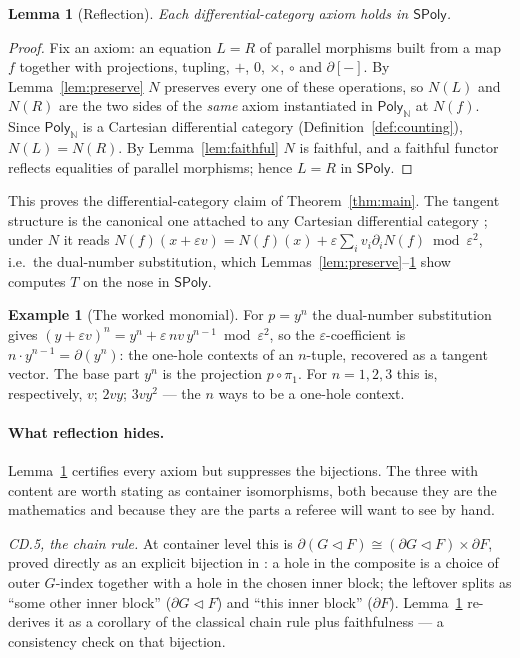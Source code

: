 \documentclass[11pt]{article}
\newtheorem{lemma}[theorem]{Lemma}
\theoremstyle{definition}
\newtheorem{example}[theorem]{Example}
\newcommand{\SPoly}{\mathsf{SPoly}}
\newcommand{\PolyN}{\mathsf{Poly}_{\mathbb{N}}}
\begin{document}
\begin{lemma}[Reflection]\label{lem:reflect}
Each differential-category axiom holds in $\SPoly$.
\end{lemma}

\begin{proof}
Fix an axiom: an equation $L=R$ of parallel morphisms built from a map $f$ together with
projections, tupling, $+$, $0$, $\times$, $\circ$ and $\partial[-]$. By Lemma~\ref{lem:preserve} $N$
preserves every one of these operations, so $N(L)$ and $N(R)$ are the two sides of the \emph{same}
axiom instantiated in $\PolyN$ at $N(f)$. Since $\PolyN$ is a Cartesian differential category
(Definition~\ref{def:counting}), $N(L)=N(R)$. By Lemma~\ref{lem:faithful} $N$ is faithful, and a
faithful functor reflects equalities of parallel morphisms; hence $L=R$ in $\SPoly$.
\end{proof}

This proves the differential-category claim of Theorem~\ref{thm:main}. The tangent structure is the
canonical one attached to any Cartesian differential category \cite[Prop.~4.7]{CockettCruttwell2014};
under $N$ it reads $N(f)(x+\varepsilon v)=N(f)(x)+\varepsilon\sum_i v_i\partial_i N(f)\bmod\varepsilon^2$,
i.e.\ the dual-number substitution, which Lemmas~\ref{lem:preserve}--\ref{lem:reflect} show computes
$T$ on the nose in $\SPoly$.

\begin{example}[The worked monomial]\label{ex:yn}
For $p=y^n$ the dual-number substitution gives
$(y+\varepsilon v)^n=y^n+\varepsilon\,n v\,y^{n-1}\bmod\varepsilon^2$, so the $\varepsilon$-coefficient
is $n\cdot y^{n-1}=\partial(y^n)$: the one-hole contexts of an $n$-tuple, recovered as a tangent vector.
The base part $y^n$ is the projection $p\circ\pi_1$. For $n=1,2,3$ this is, respectively, $v$;
$2vy$; $3vy^2$ --- the $n$ ways to be a one-hole context.
\end{example}

\paragraph{What reflection hides.}
Lemma~\ref{lem:reflect} certifies every axiom but suppresses the bijections. The three with content
are worth stating as container isomorphisms, both because they are the mathematics and because they
are the parts a referee will want to see by hand.

\emph{CD.5, the chain rule.} At container level this is
$\partial(G\lhd F)\cong(\partial G\lhd F)\times\partial F$, proved directly as an explicit bijection in
\cite[Thm.~1]{MacBethChainRule}: a hole in the composite is a choice of outer $G$-index together with
a hole in the chosen inner block; the leftover splits as ``some other inner block'' ($\partial G\lhd
F$) and ``this inner block'' ($\partial F$). Lemma~\ref{lem:reflect} re-derives it as a corollary of
the classical chain rule plus faithfulness --- a consistency check on that bijection.
\end{document}
